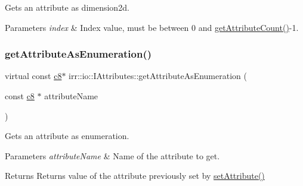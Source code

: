 Gets an attribute as dimension2d. 


\begin{DoxyParams}{Parameters}
{\em index} & Index value, must be between 0 and \hyperlink{classirr_1_1io_1_1IAttributes_a796bdd9440ee7ba0b6742a90a82870b6}{get\+Attribute\+Count()}-\/1. \\
\hline
\end{DoxyParams}
\mbox{\label{classirr_1_1io_1_1IAttributes_a2a204c332735a0b15fa555ae6e785214}} 
\subsubsection{\texorpdfstring{get\+Attribute\+As\+Enumeration()}{getAttributeAsEnumeration()}\hspace{0.1cm}{\footnotesize\ttfamily [1/8]}}
{\footnotesize\ttfamily virtual const \hyperlink{namespaceirr_a9395eaea339bcb546b319e9c96bf7410}{c8}$\ast$ irr\+::io\+::\+I\+Attributes\+::get\+Attribute\+As\+Enumeration (\begin{DoxyParamCaption}\item[{const \hyperlink{namespaceirr_a9395eaea339bcb546b319e9c96bf7410}{c8} $\ast$}]{attribute\+Name }\end{DoxyParamCaption})\hspace{0.3cm}{\ttfamily [pure virtual]}}



Gets an attribute as enumeration. 


\begin{DoxyParams}{Parameters}
{\em attribute\+Name} & Name of the attribute to get. \\
\hline
\end{DoxyParams}
\begin{DoxyReturn}{Returns}
Returns value of the attribute previously set by \hyperlink{classirr_1_1io_1_1IAttributes_a03fa31acb481ae23678676cc183f09a6}{set\+Attribute()} 
\end{DoxyReturn}
\mbox{\label{classirr_1_1io_1_1IAttributes_a2a204c332735a0b15fa555ae6e785214}} 
